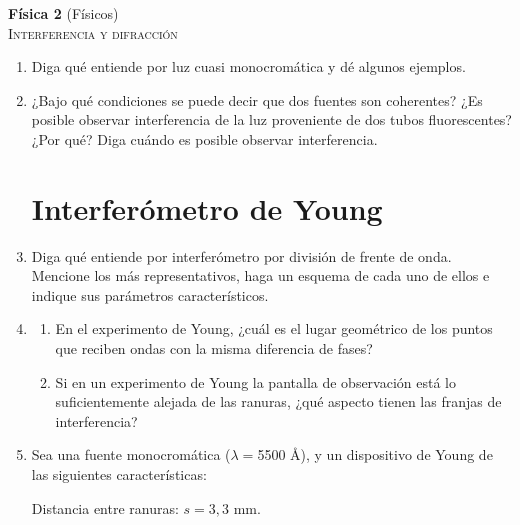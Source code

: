 \documentclass[11pt,spanish,a4paper]{article}
\begin{document}
\begin{center}
  \textbf{Física 2} (Físicos) \hfill {}\\
  \textsc{\LARGE Interferencia y difracción}
\par\end{center}{\large \par}



\begin{enumerate}
\section*{Condiciones}

\item Diga qué entiende por luz cuasi monocromática y dé algunos ejemplos.


\item ¿Bajo qué condiciones se puede decir que dos fuentes son coherentes?
¿Es posible observar interferencia de la luz proveniente de dos tubos
fluorescentes? ¿Por qué? Diga cuándo es posible observar interferencia.


\section*{Interferómetro de Young}

\item Diga qué entiende por interferómetro por división de frente de onda.
Mencione los más representativos, haga un esquema de cada uno de ellos
e indique sus parámetros característicos.


\item 
\begin{enumerate}
\item En el experimento de Young, ¿cuál es el lugar geométrico de los puntos
que reciben ondas con la misma diferencia de fases?
\item Si en un experimento de Young la pantalla de observación está lo suficientemente
alejada de las ranuras, ¿qué aspecto tienen las franjas de interferencia?
\end{enumerate}


\item Sea una fuente monocromática ($\lambda=$5500 Å), y un dispositivo
de Young de las siguientes características: 

Distancia entre ranuras: $s=3,3$ mm. 


\end{enumerate}
\end{document}
